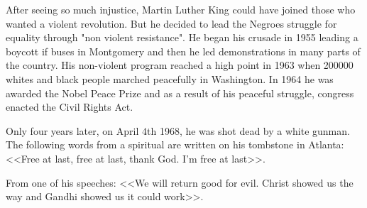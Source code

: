 After seeing so much injustice, Martin Luther King could have joined those who wanted a violent revolution. But he decided to lead the Negroes struggle for equality through "non violent resistance". He began his crusade in 1955 leading a boycott if buses in Montgomery and then he led demonstrations in many parts of the country. His non-violent program reached a high point in 1963  when 200000 whites and black people marched peacefully in Washington. In 1964 he was awarded the Nobel Peace Prize and as a result of his peaceful struggle, congress enacted the Civil Rights Act.

Only four years later, on April $4$th 1968, he was shot dead by a white gunman. The following words from a spiritual are written on his tombstone in Atlanta: <<Free at last, free at last, thank God. I'm free at last>>.

From one of his speeches: <<We will return good for evil. Christ showed us the way and Gandhi showed us it could work>>.

